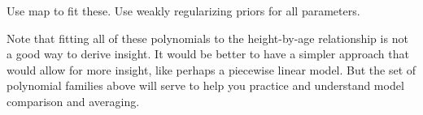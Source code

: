 \documentclass[12pt]{article}\usepackage[]{graphicx}\usepackage[]{color}
\begin{document}
Use map to fit these. Use weakly regularizing priors for all parameters.

Note that fitting all of these polynomials to the height-by-age relationship is not a good way to derive insight. It would be better to have a simpler approach that would allow for more insight, like perhaps a piecewise linear model. But the set of polynomial families above will serve to help you practice and understand model comparison and averaging.
\end{document}
